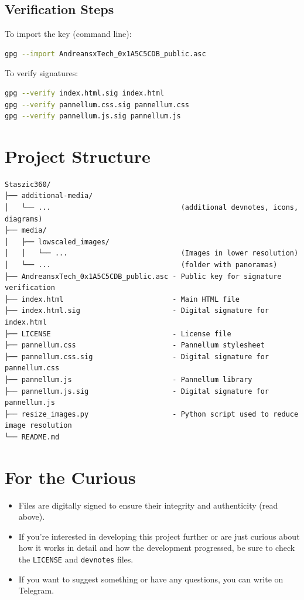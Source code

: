 \documentclass[11pt,a4paper]{article}
\begin{document}
\subsection{Verification Steps}
To import the key (command line):
\begin{lstlisting}[language=bash]
gpg --import AndreansxTech_0x1A5C5CDB_public.asc
\end{lstlisting}

To verify signatures:
\begin{lstlisting}[language=bash]
gpg --verify index.html.sig index.html
gpg --verify pannellum.css.sig pannellum.css
gpg --verify pannellum.js.sig pannellum.js
\end{lstlisting}

\section{Project Structure}
\begin{tcolorbox}[colback=gray!10,colframe=gray!50!black,title=Directory Structure]
\begin{lstlisting}
Staszic360/
├── additional-media/
│   └── ...                               (additional devnotes, icons, diagrams)
├── media/
│   ├── lowscaled_images/
│   │   └── ...                           (Images in lower resolution)
│   └── ...                               (folder with panoramas)
├── AndreansxTech_0x1A5C5CDB_public.asc - Public key for signature verification
├── index.html                          - Main HTML file
├── index.html.sig                      - Digital signature for index.html
├── LICENSE                             - License file
├── pannellum.css                       - Pannellum stylesheet
├── pannellum.css.sig                   - Digital signature for pannellum.css
├── pannellum.js                        - Pannellum library
├── pannellum.js.sig                    - Digital signature for pannellum.js
├── resize_images.py                    - Python script used to reduce image resolution
└── README.md
\end{lstlisting}
\end{tcolorbox}

\section{For the Curious}
\begin{itemize}[leftmargin=*]
    \item Files are digitally signed to ensure their integrity and authenticity (read above).
    \item If you're interested in developing this project further or are just curious about how it works in detail and how the development progressed, be sure to check the \texttt{LICENSE} and \texttt{devnotes} files.
    \item If you want to suggest something or have any questions, you can write on Telegram.
\end{itemize}
\end{document}
